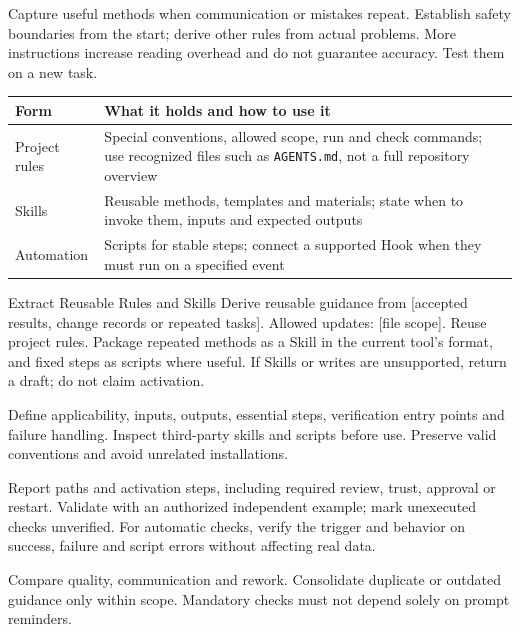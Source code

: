 Capture useful methods when communication or mistakes repeat. Establish safety boundaries from the start; derive other rules from actual problems. More instructions increase reading overhead and do not guarantee accuracy. Test them on a new task.
\begin{tabularx}{\linewidth}{@{}L{32mm}Y@{}}
\toprule Form & What it holds and how to use it\\\midrule
Project rules & Special conventions, allowed scope, run and check commands; use recognized files such as \texttt{AGENTS.md}, not a full repository overview\\
Skills & Reusable methods, templates and materials; state when to invoke them, inputs and expected outputs\\
Automation & Scripts for stable steps; connect a supported Hook when they must run on a specified event\\
\bottomrule\end{tabularx}
\begin{prompt}{Extract Reusable Rules and Skills}
Derive reusable guidance from [accepted results, change records or repeated tasks]. Allowed updates: [file scope]. Reuse project rules. Package repeated methods as a Skill in the current tool's format, and fixed steps as scripts where useful. If Skills or writes are unsupported, return a draft; do not claim activation.\par
Define applicability, inputs, outputs, essential steps, verification entry points and failure handling. Inspect third-party skills and scripts before use. Preserve valid conventions and avoid unrelated installations.\par
Report paths and activation steps, including required review, trust, approval or restart. Validate with an authorized independent example; mark unexecuted checks unverified. For automatic checks, verify the trigger and behavior on success, failure and script errors without affecting real data.\par
Compare quality, communication and rework. Consolidate duplicate or outdated guidance only within scope. Mandatory checks must not depend solely on prompt reminders.
\end{prompt}
